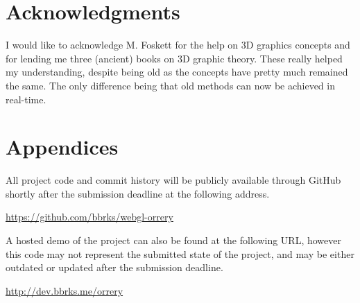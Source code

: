 \documentclass{scrreprt}
\begin{document}
\chapter{Acknowledgments}

I would like to acknowledge M. Foskett for the help on 3D graphics concepts and for lending me three (ancient) books on 3D graphic theory. These really helped my understanding, despite being old as the concepts have pretty much remained the same. The only difference being that old methods can now be achieved in real-time.\cite{computergraphicsprinciplesandpractice}\cite{graphicsgems}\cite{three-dimensionalcomputergraphics}

\chapter{Appendices}

All project code and commit history will be publicly available through GitHub shortly after the submission deadline at the following address.

\url{https://github.com/bbrks/webgl-orrery}

A hosted demo of the project can also be found at the following URL, however this code may not represent the submitted state of the project, and may be either outdated or updated after the submission deadline.

\url{http://dev.bbrks.me/orrery}
\end{document}
